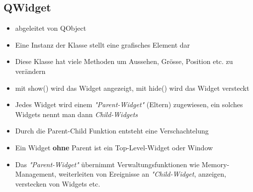 \subsection{QWidget}
\begin{itemize}
	\item abgeleitet von QObject
	\item Eine Instanz der Klasse stellt eine grafisches Element dar
	\item Diese Klasse hat viele Methoden um Aussehen, Grösse, Position etc. zu verändern
	\item mit show() wird das Widget angezeigt, mit hide() wird das Widget versteckt
	\item Jedes Widget wird einem \textit{"Parent-Widget"} (Eltern) zugewiesen, ein solches Widgets nennt man dann \textit{Child-Widgets}
	\item Durch die Parent-Child Funktion entsteht eine Verschachtelung
	\item Ein Widget \textbf{ohne} Parent ist ein Top-Level-Widget oder Window	
	\item Das \textit{"Parent-Widget"} übernimmt Verwaltungsfunktionen wie Memory-Management, \newline
    weiterleiten von Ereignisse an \textit{"Child-Widget}, anzeigen, verstecken von Widgets etc.
\end{itemize}

